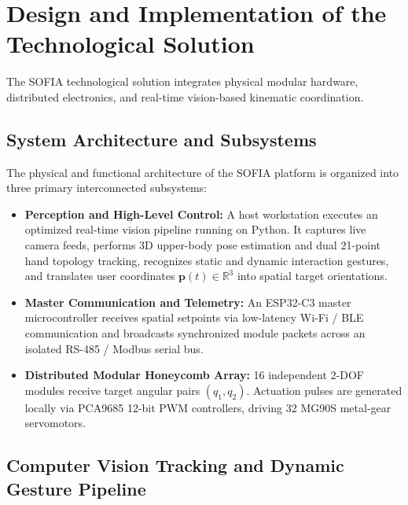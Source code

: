 \documentclass[lettersize,journal]{IEEEtran}
\begin{document}
\section{Design and Implementation of the Technological Solution}
\label{sec:design}

The SOFIA technological solution integrates physical modular hardware, distributed electronics, and real-time vision-based kinematic coordination.

\subsection{System Architecture and Subsystems}
\label{sec:system_architecture}

The physical and functional architecture of the SOFIA platform is organized into three primary interconnected subsystems:
\begin{itemize}
\item \textbf{Perception and High-Level Control:} A host workstation executes an optimized real-time vision pipeline running on Python. It captures live camera feeds, performs 3D upper-body pose estimation and dual 21-point hand topology tracking, recognizes static and dynamic interaction gestures, and translates user coordinates $\mathbf{p}(t) \in \mathbb{R}^3$ into spatial target orientations.
\item \textbf{Master Communication and Telemetry:} An ESP32-C3 master microcontroller receives spatial setpoints via low-latency Wi-Fi / BLE communication and broadcasts synchronized module packets across an isolated RS-485 / Modbus serial bus.
\item \textbf{Distributed Modular Honeycomb Array:} 16 independent 2-DOF modules receive target angular pairs $(q_1, q_2)$. Actuation pulses are generated locally via PCA9685 12-bit PWM controllers, driving 32 MG90S metal-gear servomotors.
\end{itemize}

\subsection{Computer Vision Tracking and Dynamic Gesture Pipeline}
\label{sec:vision_pipeline}
\end{document}
